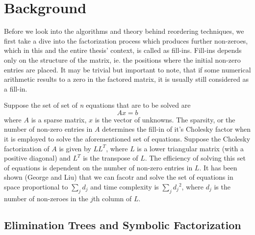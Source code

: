 

\chapter{Background}
\label{ch:background}



Before we look into the algorithms and theory behind reordering techniques, we first take a dive into the factorization process which produces further non-zeroes, which in this and the entire thesis' context, is called as fill-ins. Fill-ins depends only on the structure of the matrix, ie. the positions where the initial non-zero entries are placed. It may be trivial but important to note, that if some numerical arithmetic results to a zero in the factored matrix, it is usually still considered as a fill-in. 

Suppose the set of set of \textit{n} equations that are to be solved are
\begin{equation}
    Ax = b
\end{equation}
where \(A\) is a sparse matrix, \(x\) is the vector of unknowns. The sparsity, or the number of non-zero entries in \(A\) determines the fill-in of it's Cholesky factor when it is employed to solve the aforementioned set of equations. 
Suppose the Cholesky factorization of \(A\) is given by \(LL^T\), where \(L\) is a lower triangular matrix (with a positive diagonal) and \(L^T\) is the transpose of \(L\). The efficiency of solving this set of equations is dependent on the number of non-zero entries in \(L\). It has been shown (George and Liu) that we can facotr and solve the set of equations in space proportional to  \(\sum_j d_j\) and time complexity is  \(\sum_j {d_j}^2\), where \(d_j\) is the number of non-zeroes in the \(j\)th column of \(L\).


\section{Elimination Trees and Symbolic Factorization}
\label{sec:elim_tree}

